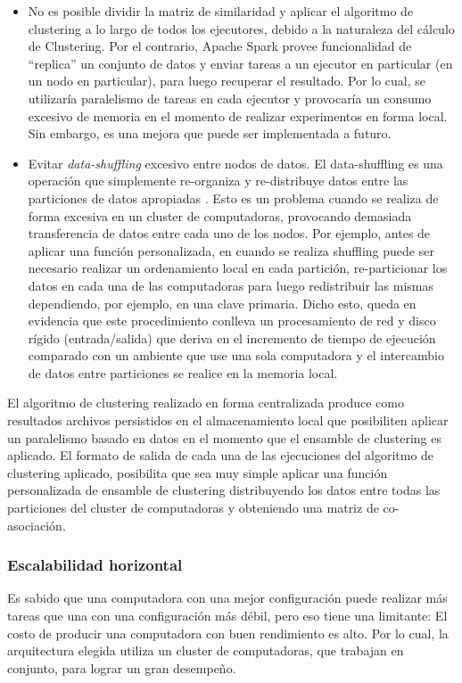 \begin{itemize}
	\item No es posible dividir la matriz de similaridad y aplicar el algoritmo de clustering a lo largo de todos los ejecutores, debido a la naturaleza del cálculo de Clustering. Por el contrario, Apache Spark provee funcionalidad de ``replica'' un conjunto de datos y enviar tareas a un ejecutor en particular (en un nodo en particular), para luego recuperar el resultado. Por lo cual, se utilizaría paralelismo de tareas en cada ejecutor y provocaría un consumo excesivo de memoria en el momento de realizar experimentos en forma local. Sin embargo, es una mejora que puede ser implementada a futuro.
	\item Evitar \textit{data-shuffling} excesivo entre nodos de datos. El data-shuffling es una operación que simplemente re-organiza y re-distribuye datos entre las particiones de datos apropiadas \citep{zhang2012optimizing}. Esto es un problema cuando se realiza de forma excesiva en un cluster de computadoras, provocando demasiada transferencia de datos entre cada uno de los nodos. Por ejemplo, antes de aplicar una función personalizada, en cuando se realiza shuffling puede ser necesario realizar un ordenamiento local en cada partición, re-particionar los datos en cada una de las computadoras para luego redistribuir las mismas dependiendo, por ejemplo, en una clave primaria. Dicho esto, queda en evidencia que este procedimiento conlleva un procesamiento de red y disco rígido (entrada/salida) que deriva en el incremento de tiempo de ejecución comparado con un ambiente que use una sola computadora y el intercambio de datos entre particiones se realice en la memoria local.
\end{itemize}

El algoritmo de clustering realizado en forma centralizada produce como resultados archivos persistidos en el almacenamiento local que posibiliten aplicar un paralelismo basado en datos en el momento que el ensamble de clustering es aplicado. El formato de salida de cada una de las ejecuciones del algoritmo de clustering aplicado, posibilita que sea muy simple aplicar una función personalizada de ensamble de clustering distribuyendo los datos entre todas las particiones del cluster de computadoras y obteniendo una matriz de co-asociación.

\subsubsection{Escalabilidad horizontal}
Es sabido que una computadora con una mejor configuración puede realizar más tareas que una con una configuración más débil, pero eso tiene una limitante: El costo de producir una computadora con buen rendimiento es alto. Por lo cual, la arquitectura elegida utiliza un cluster de computadoras, que trabajan en conjunto, para lograr un gran desempeño.

